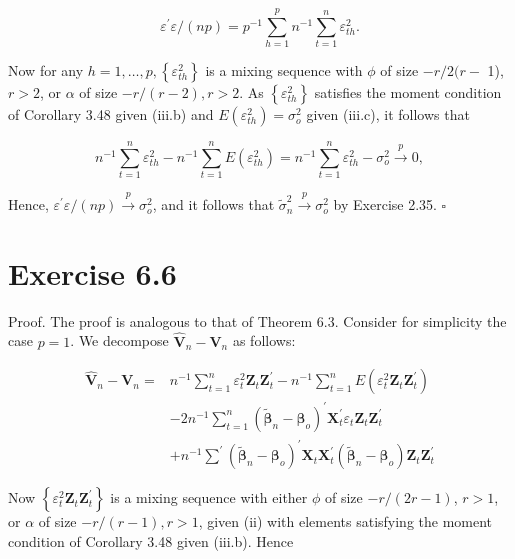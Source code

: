 \documentclass[10pt]{article}
\begin{document}
$$
\varepsilon^{\prime} \varepsilon /(n p)=p^{-1} \sum_{h=1}^{p} n^{-1} \sum_{t=1}^{n} \varepsilon_{t h}^{2} .
$$

Now for any $h=1, \ldots, p,\left\{\varepsilon_{t h}^{2}\right\}$ is a mixing sequence with $\phi$ of size $-r / 2(r-$ 1), $r>2$, or $\alpha$ of size $-r /(r-2), r>2$. As $\left\{\varepsilon_{t h}^{2}\right\}$ satisfies the moment condition of Corollary 3.48 given (iii.b) and $E\left(\varepsilon_{t h}^{2}\right)=\sigma_{o}^{2}$ given (iii.c), it follows that

$$
n^{-1} \sum_{t=1}^{n} \varepsilon_{t h}^{2}-n^{-1} \sum_{t=1}^{n} E\left(\varepsilon_{t h}^{2}\right)=n^{-1} \sum_{t=1}^{n} \varepsilon_{t h}^{2}-\sigma_{o}^{2} \xrightarrow{p} 0,
$$

Hence, $\varepsilon^{\prime} \varepsilon /(n p) \xrightarrow{p} \sigma_{o}^{2}$, and it follows that $\tilde{\sigma}_{n}^{2} \xrightarrow{p} \sigma_{o}^{2}$ by Exercise 2.35. \(\square\)

\section*{Exercise 6.6}
Proof. The proof is analogous to that of Theorem 6.3. Consider for simplicity the case $p=1$. We decompose $\hat{\mathbf{V}}_{n}-\mathbf{V}_{n}$ as follows:

$$
\begin{aligned}
\hat{\mathbf{V}}_{n}-\mathbf{V}_{n}= & n^{-1} \sum_{t=1}^{n} \varepsilon_{t}^{2} \mathbf{Z}_{t} \mathbf{Z}_{t}^{\prime}-n^{-1} \sum_{t=1}^{n} E\left(\varepsilon_{t}^{2} \mathbf{Z}_{t} \mathbf{Z}_{t}^{\prime}\right) \\
& -2 n^{-1} \sum_{t=1}^{n}\left(\tilde{\boldsymbol{\beta}}_{n}-\boldsymbol{\beta}_{o}\right)^{\prime} \mathbf{X}_{t}^{\prime} \varepsilon_{t} \mathbf{Z}_{t} \mathbf{Z}_{t}^{\prime} \\
& +n^{-1} \sum^{\prime}\left(\tilde{\boldsymbol{\beta}}_{n}-\boldsymbol{\beta}_{o}\right)^{\prime} \mathbf{X}_{t} \mathbf{X}_{t}^{\prime}\left(\tilde{\boldsymbol{\beta}}_{n}-\boldsymbol{\beta}_{o}\right) \mathbf{Z}_{t} \mathbf{Z}_{t}^{\prime}
\end{aligned}
$$

Now $\left\{\varepsilon_{t}^{2} \mathbf{Z}_{t} \mathbf{Z}_{t}^{\prime}\right\}$ is a mixing sequence with either $\phi$ of size $-r /(2 r-1)$, $r>1$, or $\alpha$ of size $-r /(r-1), r>1$, given (ii) with elements satisfying the moment condition of Corollary 3.48 given (iii.b). Hence
\end{document}
